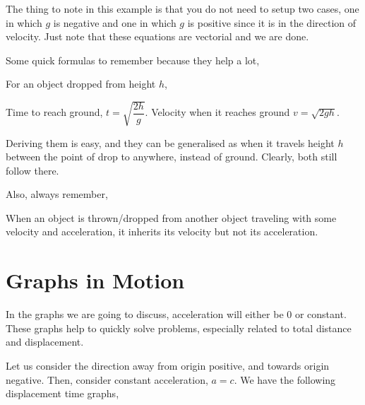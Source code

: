The thing to note in this example is that you do not need to setup two cases, one in which
\(g\) is negative and one in which \(g\) is positive since it is in the direction of velocity. 
Just note that these equations are vectorial and we are done.

Some quick formulas to remember because they help a lot,

\begin{algorithm}
    For an object dropped from height \(h\),
    \begin{enumerate}
        \ii Time to reach ground, \(t = \sqrt{\dfrac{2h}{g}}\).
        \ii Velocity when it reaches ground \(v = \sqrt{2gh}\).
    \end{enumerate}
\end{algorithm}

Deriving them is easy, and they can be generalised as when it travels height \(h\) between
the point of drop to anywhere, instead of ground. Clearly, both still follow there.

Also, always remember,

\begin{moral}
    When an object is thrown/dropped from another object traveling with some velocity and
    acceleration, it inherits its velocity but not its acceleration.
\end{moral}


\section{Graphs in Motion}

In the graphs we are going to discuss, acceleration will either be \(0\) or constant.
These graphs help to quickly solve problems, especially related to total distance and 
displacement. 

Let us consider the direction away from origin positive, and towards origin negative.
Then, consider constant acceleration, \(a = c\). We have the following displacement time
graphs,

